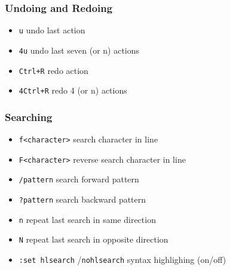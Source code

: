 \documentclass{beamer}
\begin{document}


\begin{frame}
\frametitle{Undoing and Redoing}

\begin{itemize}
\item \texttt{u} undo last action
\item \texttt{4u} undo last seven (or n) actions
\item \texttt{Ctrl+R} redo action
\item \texttt{4Ctrl+R} redo 4 (or n) actions
\end{itemize}

\end{frame}



\begin{frame}
\frametitle{Searching}

\begin{itemize}
\item \texttt{f<character>} search character in line
\item \texttt{F<character>} reverse search character in line
\item \texttt{/pattern} search forward pattern 
\item \texttt{?pattern} search backward pattern 
\item \texttt{n} repeat last search in same direction
\item \texttt{N} repeat last search in opposite direction
\item \texttt{:set hlsearch} /\texttt{nohlsearch} syntax highlighing (on/off)
\end{itemize}

\end{frame}

\end{document}
